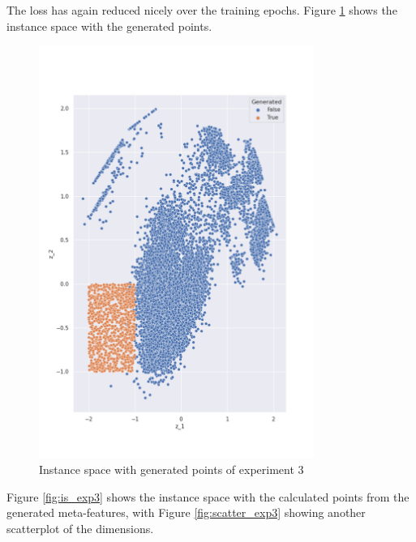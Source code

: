 The loss has again reduced nicely over the training epochs. Figure \ref{fig:is_gen_points3} shows the instance space with the generated points.

\begin{figure}[H]
    \centering
    \includegraphics[width=0.8\textwidth]{Cap5/is_exp3.png}
    \caption{Instance space with generated points of experiment 3}
    \label{fig:is_gen_points3}
\end{figure}


Figure \ref{fig:is_exp3} shows the instance space with the calculated points from the generated meta-features, with Figure \ref{fig:scatter_exp3} showing another scatterplot of the dimensions.

